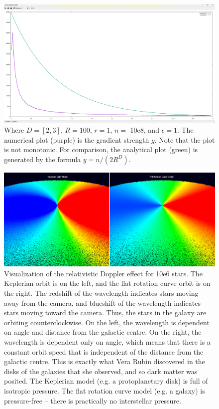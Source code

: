 \documentclass[12pt]{article}
\begin{document}
\begin{figure} 
\centering
\label{fig4}
  \includegraphics[width = 7 in]{numerical_versus_analytical.png}
  \caption{
Where $D = [2, 3]$, $R = 100$, $r = 1$, $n = $ 10e8, and $\epsilon = 1$.
The numerical plot (purple) is the gradient strength $g$. 
Note that the plot is not monotonic.
For comparison, the analytical plot (green) is generated by the formula $y = n / (2 R^D)$.
}
\end{figure}


\begin{figure} 
\centering
\label{fig6}
  \includegraphics[width = 7 in]{doppler.png}
  \caption{
Visualization of the relativistic Doppler effect for 10e6 stars.
The Keplerian orbit is on the left, and the flat rotation curve orbit is on the right.
The redshift of the wavelength indicates stars moving away from the camera, and blueshift of the wavelength indicates stars moving toward the camera.
Thus, the stars in the galaxy are orbiting counterclockwise.
On the left, the wavelength is dependent on angle and distance from the galactic centre.
On the right, the wavelength is dependent only on angle, which means that there is a constant orbit speed that is independent of the distance from the galactic centre.
This is exactly what Vera Rubin discovered in the disks of the galaxies that she observed, and so dark matter was posited.
The Keplerian model (e.g. a protoplanetary disk) is full of isotropic pressure.
The flat rotation curve model (e.g. a galaxy) is pressure-free -- there is practically no interstellar pressure.
}
\end{figure}
\end{document}

